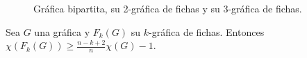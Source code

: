 \begin{figure}[ht!]
    \caption{Gr\'afica bipartita, su 2-gr\'afica de fichas y su 3-gr\'afica de fichas.}
    \label{fig:ex-bip}
\end{figure}
    \begin{teorema}
        \label{relacion num cromatico G y F(G) con k}
            Sea $G$ una gr\'afica y $F_k(G)$ su $k$-gr\'afica de fichas.
            Entonces $\chi(F_k(G)) \geq \frac{n-k+2}{n} \chi(G) -1$.
        \end{teorema}
        
